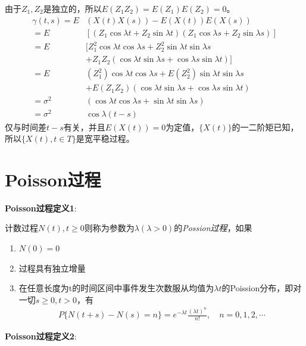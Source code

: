 \begin{enumerate}
	      由于\(Z_1,Z_2\)是独立的，所以\(E(Z_1Z_2)=E(Z_1)E(Z_2)=0\)。
	      \begin{align*}
		      \gamma(t,s)
		      =  E      & (X(t)X(s))-E(X(t))E(X(s))                                                           \\
		      =  E      & \left[(Z_1\cos\lambda t+Z_2\sin\lambda t)(Z_1\cos\lambda s+Z_2\sin\lambda s)\right] \\
		      =  E      & [Z_1^2\cos \lambda t \cos \lambda s+Z_2^2\sin \lambda t \sin \lambda s              \\
		                & +Z_1Z_2(\cos \lambda t \sin \lambda s+\cos \lambda s \sin \lambda t)]               \\
		      =  E      & (Z_1^2)\cos \lambda t \cos \lambda s +E(Z_2^2)\sin \lambda t \sin \lambda s         \\
		                & +E(Z_1Z_2)(\cos \lambda t \sin \lambda s+\cos \lambda s \sin \lambda t)             \\
		      =\sigma^2 & (\cos \lambda t \cos \lambda s+\sin \lambda t \sin \lambda s)                       \\
		      =\sigma^2 & \cos\lambda(t-s)
	      \end{align*}
	      仅与时间差\(t-s\)有关，并且\(E(X(t))=0\)为定值，\(\{X(t)\}\)的一二阶矩已知，所以\(\{X(t),t\in T\}\)是宽平稳过程。
\end{enumerate}
\section{Poisson过程}
\textbf{Poisson过程定义1}:

计数过程\(N(t),t\geqslant 0\)则称为参数为\(\lambda (\lambda >0 )\)的\emph{Possion过程}，如果
\begin{enumerate}[\bfseries (1)]
	\item \(N(0)=0\)
	\item 过程具有独立增量
	\item 在任意长度为t的时间区间中事件发生次数服从均值为\(\lambda t\)的Poission分布，即对一切\(s\geqslant 0,t>0\)，有\begin{align*}P\{N(t+s)-N(s)=n\}=e^{-\lambda t}\frac{(\lambda t)^n}{n!},\quad n=0,1,2,\cdots\end{align*}
\end{enumerate}

\textbf{Poisson过程定义2}:


